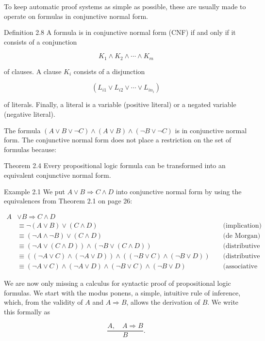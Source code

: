 \documentclass[10pt]{article}
\begin{document}
To keep automatic proof systems as simple as possible, these are usually made to operate on formulas in conjunctive normal form.

Definition 2.8 A formula is in conjunctive normal form (CNF) if and only if it consists of a conjunction

$$
K_{1} \wedge K_{2} \wedge \cdots \wedge K_{m}
$$

of clauses. A clause $K_{i}$ consists of a disjunction

$$
\left(L_{i 1} \vee L_{i 2} \vee \cdots \vee L_{i n_{i}}\right)
$$

of literals. Finally, a literal is a variable (positive literal) or a negated variable (negative literal).

The formula $(A \vee B \vee \neg C) \wedge(A \vee B) \wedge(\neg B \vee \neg C)$ is in conjunctive normal form. The conjunctive normal form does not place a restriction on the set of formulas because:

Theorem 2.4 Every propositional logic formula can be transformed into an equivalent conjunctive normal form.

Example 2.1 We put $A \vee B \Rightarrow C \wedge D$ into conjunctive normal form by using the equivalences from Theorem 2.1 on page 26:

$$
\begin{aligned}
A & \vee B \Rightarrow C \wedge D & & \\
& \equiv \neg(A \vee B) \vee(C \wedge D) & & \text { (implication) } \\
& \equiv(\neg A \wedge \neg B) \vee(C \wedge D) & & \text { (de Morgan) } \\
& \equiv(\neg A \vee(C \wedge D)) \wedge(\neg B \vee(C \wedge D)) & & \text { (distributive law) } \\
& \equiv((\neg A \vee C) \wedge(\neg A \vee D)) \wedge((\neg B \vee C) \wedge(\neg B \vee D)) & & \text { (distributive law) } \\
& \equiv(\neg A \vee C) \wedge(\neg A \vee D) \wedge(\neg B \vee C) \wedge(\neg B \vee D) & & \text { (associative law) }
\end{aligned}
$$

We are now only missing a calculus for syntactic proof of propositional logic formulas. We start with the modus ponens, a simple, intuitive rule of inference, which, from the validity of $A$ and $A \Rightarrow B$, allows the derivation of $B$. We write this formally as

$$
\frac{A, \quad A \Rightarrow B}{B} .
$$
\end{document}
